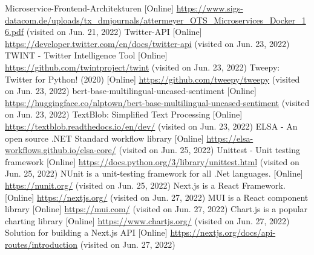 \documentclass[conference]{IEEEtran}
\begin{document}
\pagebreak
\begin{thebibliography}{0}
    Microservice-Frontend-Architekturen [Online] \url{https://www.sigs-datacom.de/uploads/tx_dmjournals/attermeyer_OTS_Microservices_Docker_16.pdf} (visited on Jun. 21, 2022)
    Twitter-API [Online] \url{https://developer.twitter.com/en/docs/twitter-api} (visited on Jun. 23, 2022)
    TWINT - Twitter Intelligence Tool [Online] \url{https://github.com/twintproject/twint} (visited on Jun. 23, 2022)
    Tweepy: Twitter for Python! (2020) [Online] \url{https://github.com/tweepy/tweepy} (visited on Jun. 23, 2022)
    bert-base-multilingual-uncased-sentiment [Online] \url{https://huggingface.co/nlptown/bert-base-multilingual-uncased-sentiment} (visited on Jun. 23, 2022)
    TextBlob: Simplified Text Processing [Online] \url{https://textblob.readthedocs.io/en/dev/} (visited on Jun. 23, 2022)
    ELSA - An open source .NET Standard workflow library [Online] \url{https://elsa-workflows.github.io/elsa-core/} (visited on Jun. 25, 2022)
    Unittest - Unit testing framework [Online] \url{https://docs.python.org/3/library/unittest.html} (visited on Jun. 25, 2022)
    NUnit is a unit-testing framework for all .Net languages. [Online] \url{https://nunit.org/} (visited on Jun. 25, 2022)
     Next.js is a React Framework. [Online] \url{https://nextjs.org/} (visited on Jun. 27, 2022)
     MUI is a React component library [Online] \url{https://mui.com/} (visited on Jun. 27, 2022)
     Chart.js is a popular charting library [Online] \url{https://www.chartjs.org/} (visited on Jun. 27, 2022)
     Solution for building a Next.js API [Online] \url{https://nextjs.org/docs/api-routes/introduction} (visited on Jun. 27, 2022)
\end{thebibliography}
\end{document}

